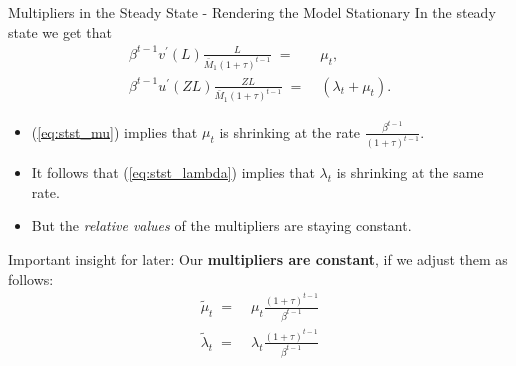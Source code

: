 \documentclass[10pt,c,aspectratio=1610,handout]{beamer}
\begin{document}
\begin{frame}{Multipliers in the Steady State - Rendering the Model Stationary}%
  In the steady state we get that%
  \begin{align}%
    \beta^{t-1} v^{\prime}(L) \frac{L}{\bar M_1 (1+\tau)^{t-1}} \; = & \; \mu_{t},\label{eq:stst_mu}\\%
    \beta^{t-1} u^{\prime}(Z L) \frac{Z L}{\bar M_1 (1+\tau)^{t-1}} \; = & \; \left( \lambda_{t} + \mu_{t} \right).\label{eq:stst_lambda}%
  \end{align}%
  \pause%
  \begin{itemize}%
    \item[$\blacktriangleright$] (\ref{eq:stst_mu}) implies that $\mu_t$ is shrinking at the rate $\frac{\beta^{t-1}}{(1+\tau)^{t-1}}$.%
    \pause%
    \item[$\blacktriangleright$] It follows that (\ref{eq:stst_lambda}) implies that $\lambda_t$ is shrinking at the same rate.%
    \pause%
    \item[$\Rightarrow$] But the \textit{relative values} of the multipliers are staying constant.%
  \end{itemize}%
  \vspace*{0.1in}%
  \pause%
  Important insight for later: Our \textbf{multipliers are constant}, if we adjust them as follows:%
  \begin{align*}%
    \tilde{\mu}_t \; = & \; \mu_{t} \frac{(1+\tau)^{t-1}}{\beta^{t-1}}\\%
    \tilde{\lambda}_t \; = & \; \lambda _{t} \frac{(1+\tau)^{t-1}}{\beta^{t-1}}%
  \end{align*}%
\end{frame}%
\end{document}

